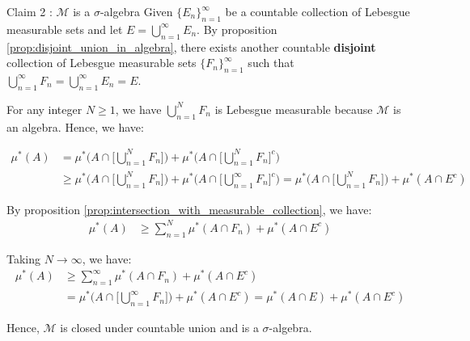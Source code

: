 \begin{proof*}
    \begin{subproof}{\newline Claim 2 : $\mathcal{M}$ is a $\sigma$-algebra}
        Given $\{E_n\}_{n=1}^\infty$ be a countable collection of Lebesgue measurable sets and let $E=\bigcup_{n=1}^\infty E_n$. By proposition \ref{prop:disjoint_union_in_algebra}, there exists another countable \textbf{disjoint} collection of Lebesgue measurable sets $\{F_n\}_{n=1}^\infty$ such that $\bigcup_{n=1}^\infty F_n = \bigcup_{n=1}^\infty E_n=E$. 
        
        \noindent \newline For any integer $N\ge1$, we have $\bigcup_{n=1}^N F_n$ is Lebesgue measurable because $\mathcal{M}$ is an algebra. Hence, we have:
    
        \begin{align*}
            \mu^*(A) &= \mu^*\Bigg( A \cap \Bigg[ \bigcup_{n=1}^N F_n \Bigg] \Bigg) + \mu^*\Bigg( A \cap \Bigg[ \bigcup_{n=1}^N F_n \Bigg]^c \Bigg) \\
            &\ge \mu^*\Bigg( A \cap \Bigg[ \bigcup_{n=1}^N F_n \Bigg] \Bigg) + \mu^*\Bigg( A \cap \Bigg[ \bigcup_{n=1}^\infty F_n \Bigg]^c \Bigg) = \mu^*\Bigg( A \cap \Bigg[ \bigcup_{n=1}^N F_n \Bigg] \Bigg) + \mu^*(A\cap E^c)
        \end{align*}

        \noindent\newline By proposition \ref{prop:intersection_with_measurable_collection}, we have:
        \begin{align*}
            \mu^*(A) &\ge \sum_{n=1}^N \mu^*(A\cap F_n) + \mu^*(A\cap E^c)
        \end{align*}

        \noindent\newline Taking $N\to\infty$, we have:
        \begin{align*}
            \mu^*(A) &\ge \sum_{n=1}^\infty \mu^*(A\cap F_n) + \mu^*(A\cap E^c) \\
            &= \mu^*\Bigg( A \cap \Bigg[ \bigcup_{n=1}^\infty F_n \Bigg]\Bigg) + \mu^*(A\cap E^c) = \mu^*(A\cap E) + \mu^*(A\cap E^c)
        \end{align*}

        \noindent\newline Hence, $\mathcal{M}$ is closed under countable union and is a $\sigma$-algebra.
    \end{subproof}
\end{proof*}



